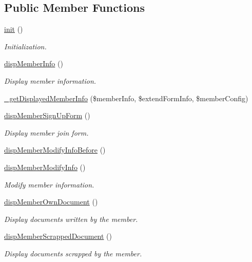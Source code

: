 \subsection*{Public Member Functions}
\begin{DoxyCompactItemize}
\item 
\hyperlink{classmemberView_a966e235b7cf76bcdddf07e601d7812b3}{init} ()
\begin{DoxyCompactList}\small\item\em Initialization. \end{DoxyCompactList}\item 
\hyperlink{classmemberView_a81e424307992bdf56ca588e8d1a84995}{disp\-Member\-Info} ()
\begin{DoxyCompactList}\small\item\em Display member information. \end{DoxyCompactList}\item 
\hyperlink{classmemberView_a9b11671586d77aa5f8ee59f3ff96ed1e}{\-\_\-get\-Displayed\-Member\-Info} (\$member\-Info, \$extend\-Form\-Info, \$member\-Config)
\item 
\hyperlink{classmemberView_a1ebd31e392f344898940c0dc739fa6cb}{disp\-Member\-Sign\-Up\-Form} ()
\begin{DoxyCompactList}\small\item\em Display member join form. \end{DoxyCompactList}\item 
\hyperlink{classmemberView_a5cb3b51c7c44b99bd37734fc053a06e4}{disp\-Member\-Modify\-Info\-Before} ()
\item 
\hyperlink{classmemberView_a8636a54e610e74b3d5fffa3611589d89}{disp\-Member\-Modify\-Info} ()
\begin{DoxyCompactList}\small\item\em Modify member information. \end{DoxyCompactList}\item 
\hyperlink{classmemberView_a8c235800dc5fc7484694b852cf7119c6}{disp\-Member\-Own\-Document} ()
\begin{DoxyCompactList}\small\item\em Display documents written by the member. \end{DoxyCompactList}\item 
\hyperlink{classmemberView_a3f2cb0686636f31174aeba8e2e048816}{disp\-Member\-Scrapped\-Document} ()
\begin{DoxyCompactList}\small\item\em Display documents scrapped by the member. \end{DoxyCompactList}\item 

\end{DoxyCompactItemize}
